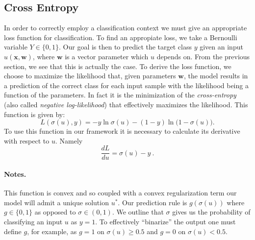 \documentclass{INGUADY}
\begin{document}
\begin{body}
\subsection{Cross Entropy}
In order to correctly employ a classification context we must give an appropriate loss function for classification. To find an appropiate loss, we take a Bernoulli variable $Y \in \{  0, 1 \}$. Our goal is then to predict the target class $y$ given an input $u(\mathbf{x}, \mathbf{w})$, where $\mathbf{w}$ is a vector parameter which $u$ depends on. From the previous section, we see that this is actually the case. To derive the loss function, we choose to maximize the likelihood that, given parameters $\mathbf{w}$, the model results in a prediction of the correct class for each input sample with the likelihood being a function of the parameters. In fact it is the minimization of the \textit{cross-entropy} \cite{crossentrop} (also called \textit{negative log-likelihood}) that effectively maximizes the likelihood. This function is given by:
\begin{equation*}
L(\sigma(u), y) =  - y \ln \sigma(u) - (1 - y) \ln \big(  1-  \sigma(u)  \big) . \label{eq:cross_entropy}
\end{equation*}
To use this function in our framework it is necessary to calculate its derivative with respect to $u$. Namely
\begin{equation*}
\dfrac{dL}{du} = \sigma(u) - y \ .
\end{equation*}

\paragraph{Notes.} This function is convex and so coupled with a convex regularization term our model will admit a unique solution $u^*$. Our prediction rule is $g(\sigma(u))$ where $g \in \{ 0, 1\}$ as opposed to $\sigma \in (0, 1)$. We outline that $\sigma$ gives us the probability of classifying an input $u$ as $y = 1$. To effectively ``binarize'' the output one must define $g$, for example, as $g = 1$ on $\sigma(u) \geq 0.5$ and $g = 0$ on $\sigma(u) < 0.5$.


\end{body}
\end{document}

